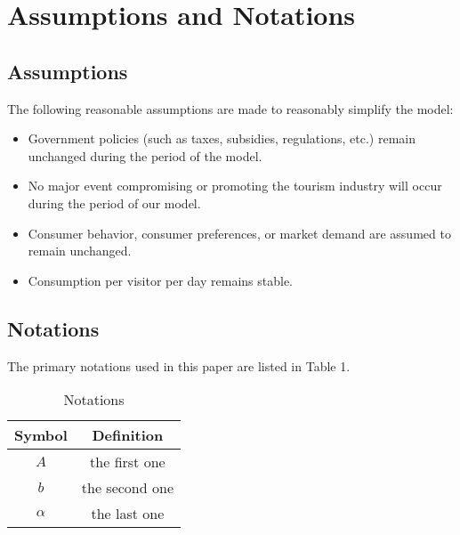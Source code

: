 \section{Assumptions and Notations}

\subsection{Assumptions}

The following reasonable assumptions are made to reasonably simplify the model:

\begin{itemize}
  \item Government policies (such as taxes, subsidies, regulations, etc.) remain unchanged during the period of the model.
  \item No major event compromising or promoting the tourism industry will occur during the period of our model.
  \item Consumer behavior, consumer preferences, or market demand are assumed to remain unchanged.
  \item Consumption per visitor per day remains stable.
\end{itemize}


\subsection{Notations}

The primary notations used in this paper are listed in Table 1.

\begin{table}[!htbp]
  \begin{center}
  \caption{Notations}
  \begin{tabular}{cc}
    \toprule
    \multicolumn{1}{m{3cm}}{\centering Symbol}
    &\multicolumn{1}{m{8cm}}{\centering Definition}\\
    \midrule
    $A$&the first one\\
    $b$&the second one\\
    $\alpha$ &the last one\\
    \bottomrule
  \end{tabular}
  \end{center}
\end{table}